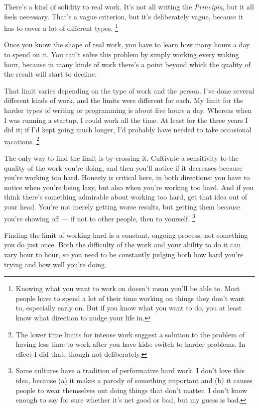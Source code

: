 \documentclass[12pt]{book}
\begin{document}
There's a kind of solidity to real work. It's not all writing the
\emph{Principia}, but it all feels necessary. That's a vague criterion,
but it's deliberately vague, because it has to cover a lot of different
types. \footnote{Knowing what you want to work on doesn't mean you'll be able to.
Most people have to spend a lot of their time working on things they
don't want to, especially early on. But if you know what you want to do,
you at least know what direction to nudge your life in.}

Once you know the shape of real work, you have to learn how many hours a
day to spend on it. You can't solve this problem by simply working every
waking hour, because in many kinds of work there's a point beyond which
the quality of the result will start to decline.

That limit varies depending on the type of work and the person. I've
done several different kinds of work, and the limits were different for
each. My limit for the harder types of writing or programming is about
five hours a day. Whereas when I was running a startup, I could work all
the time. At least for the three years I did it; if I'd kept going much
longer, I'd probably have needed to take occasional vacations.
\footnote{The lower time limits for intense work suggest a solution to the
problem of having less time to work after you have kids: switch to
harder problems. In effect I did that, though not deliberately.}

The only way to find the limit is by crossing it. Cultivate a
sensitivity to the quality of the work you're doing, and then you'll
notice if it decreases because you're working too hard. Honesty is
critical here, in both directions: you have to notice when you're being
lazy, but also when you're working too hard. And if you think there's
something admirable about working too hard, get that idea out of your
head. You're not merely getting worse results, but getting them because
you're showing off --- if not to other people, then to yourself.
\footnote{Some cultures have a tradition of performative hard work. I
don't love this idea, because (a) it makes a parody of something
important and (b) it causes people to wear themselves out doing things
that don't matter. I don't know enough to say for sure whether it's net
good or bad, but my guess is bad.}

Finding the limit of working hard is a constant, ongoing process, not
something you do just once. Both the difficulty of the work and your
ability to do it can vary hour to hour, so you need to be constantly
judging both how hard you're trying and how well you're doing.
\end{document}
